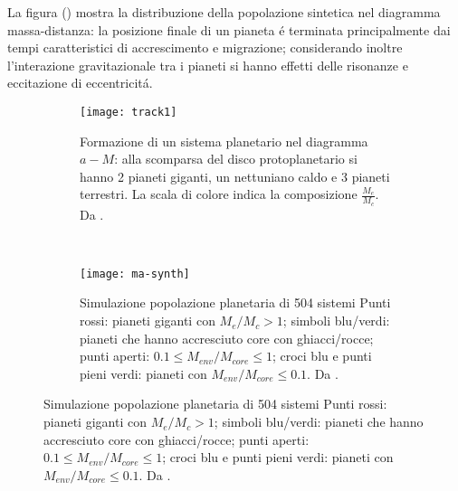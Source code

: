 La figura () mostra la distribuzione della popolazione sintetica nel diagramma massa-distanza: la posizione finale di un pianeta \'e terminata principalmente dai tempi caratteristici di accrescimento e migrazione; considerando inoltre l'interazione gravitazionale tra i pianeti si hanno effetti delle risonanze e eccitazione di eccentricit\'a.

\begin{figure}[!ht]
\begin{subfigure}[b]{0.5\textwidth}
\centering
\texttt{[image: track1]}
\caption{Formazione di un sistema planetario nel diagramma $a-M$: alla scomparsa del disco protoplanetario si hanno 2 pianeti giganti, un nettuniano caldo e 3 pianeti terrestri. La scala di colore indica la composizione $\frac{M_e}{M_c}$. Da \cite{mordasini2018planetary}.}\label{fig:track1}
\end{subfigure}
~
\begin{subfigure}[b]{0.5\textwidth}
\texttt{[image: ma-synth]}
\caption{Simulazione popolazione planetaria di 504 sistemi Punti rossi: pianeti giganti con $M_e/M_c>1$; simboli blu/verdi: pianeti che hanno accresciuto core con ghiacci/rocce; punti aperti: $0.1\leq M_{env}/M_{core}\leq1$; croci blu e punti pieni verdi: pianeti con $M_{env}/M_{core}\leq0.1$. Da \cite{mordasini2018planetary}.}\label{fig:ma-synth}
\end{subfigure}
\end{figure}

